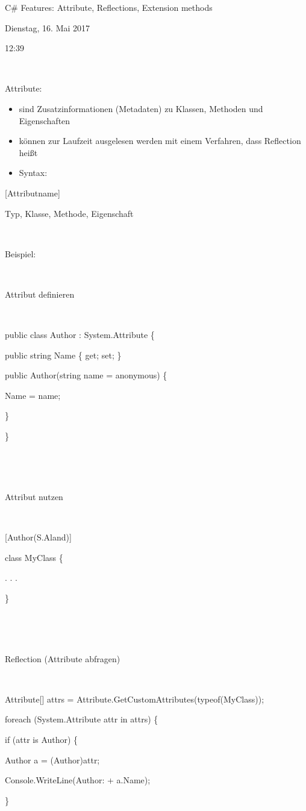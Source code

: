 C\# Features: Attribute, Reflections, Extension methods

Dienstag, 16. Mai 2017

12:39

~

Attribute: 

\begin{itemize}
\item sind Zusatzinformationen (Metadaten) zu Klassen, Methoden und Eigenschaften
\item können zur Laufzeit ausgelesen werden mit einem Verfahren, dass Reflection heißt
\item Syntax: 
\end{itemize}
[Attributname]

Typ, Klasse, Methode, Eigenschaft

~

Beispiel: 

~

Attribut definieren 

~

public class Author : System.Attribute \{ 

public string Name \{ get; set; \} 

public Author(string name = {\textquotedbl}anonymous{\textquotedbl}) \{

Name = name; 

\} 

\} 

~

~

Attribut nutzen

~

[Author({\textquotedbl}S.Aland{\textquotedbl})] 

class MyClass \{ 

 . . . 

\} 

~

~

Reflection (Attribute abfragen)

~

Attribute[] attrs = Attribute.GetCustomAttributes(typeof(MyClass));

foreach (System.Attribute attr in attrs) \{ 

if (attr is Author) \{ 

Author a = (Author)attr; 

Console.WriteLine({\textquotedbl}Author: {\textquotedbl} + a.Name); 

\} 

